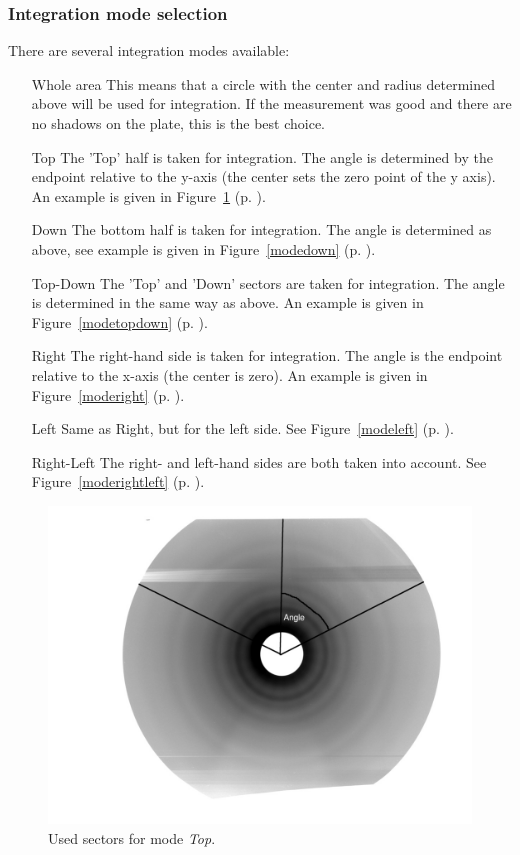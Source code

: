 \subsubsection{Integration mode selection}
There are several integration modes available: 
\begin{itemize}
\item [Whole area] This means that a circle with the center and radius determined above will be used for integration. If the measurement was good and there are no shadows on the plate, this is the best choice. 
\item[Top] The 'Top' half is taken for integration. The angle is determined by the endpoint relative to the y-axis (the center sets the zero point of the y axis). An example is given in Figure~\ref{modetop} (p. \pageref{modetop}).
\item [Down] The bottom half is taken for integration. The angle is determined as above, see example is given in Figure~\ref{modedown} (p. \pageref{modedown}).
\item [Top-Down] The 'Top' and 'Down' sectors are taken for integration. The angle is determined in the same way as above. An example is given in Figure~\ref{modetopdown} (p. \pageref{modetopdown}).
\item [Right]The right-hand side is taken for integration. The angle is the endpoint relative to the x-axis (the center is zero). An example is given in  Figure~\ref{moderight} (p. \pageref{moderight}).
\item [Left] Same as Right, but for the left side. See Figure~\ref{modeleft} (p. \pageref{modeleft}).
\item [Right-Left] The right- and left-hand sides are both taken into account. See Figure~\ref{moderightleft} (p. \pageref{moderightleft}).
\end{itemize}

\begin{figure}
\includegraphics[width=12cm]{top.jpg}
\caption{Used sectors for mode \textit{Top}. }
\label{modetop} 
\end{figure} 

